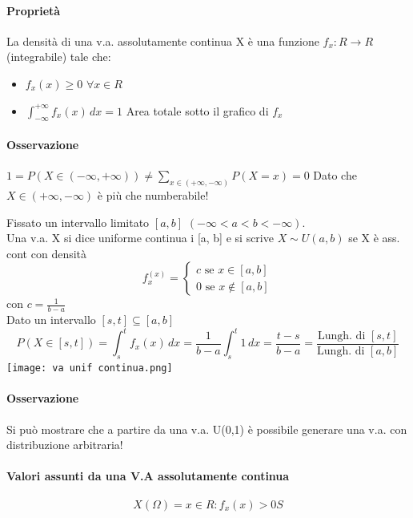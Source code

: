 \documentclass[12pt, a4paper, openany]{book}
\begin{document}
\paragraph*{Proprietà} La densità di una v.a. assolutamente continua X è una funzione 
$f_x : R \to R$ (integrabile) tale che: \begin{itemize}
    \item $f_x (x) \geq 0$ $\forall x \in R$
    \item $\int_{-\infty}^{+\infty} f_x (x) \,dx = 1$ Area 
    totale sotto il grafico di $f_x$
\end{itemize}
 \paragraph*{Osservazione} $1 = P(X \in (-\infty, +\infty)) 
 \neq \sum_{x \in (+\infty, -\infty)} P (X = x) = 0$ Dato che $X \in (+\infty, -\infty)$
 è più che numberabile!
 

Fissato un intervallo limitato $[a, b]$ $(-\infty < a < b < -\infty)$.
\\ Una v.a. X si dice uniforme continua i [a, b] e si scrive $X \sim U(a, b)$
se X è ass. cont con densità
\begin{equation*}
    f_x^(x) =
    \begin{cases}
        c \text{ se } x \in [a, b]\\
        0 \text{ se } x \notin [a, b]
    \end{cases} 
\end{equation*}
con $c = \frac{1}{b-a}$
\\ Dato un intervallo $[s, t] \subseteq [a, b]$
\begin{equation*}
    P(X \in [s,t]) = \int_s^t f_x (x) \,dx = 
    \frac{1}{b -a} \int_s^t 1 \,dx = \frac{t-s}{b-a} =
    \frac{\text{Lungh. di } [s,t]}{\text{Lungh. di } [a, b]}
\end{equation*} 
\texttt{[image: va unif continua.png]}
\paragraph*{Osservazione} Si può mostrare che a partire da una v.a. U(0,1) è possibile
generare una v.a. con distribuzione arbitraria!

\paragraph*{Valori assunti da una V.A assolutamente continua}
\begin{equation*}
    X(\Omega) = {x \in R: f_x(x) > 0S}
\end{equation*}
\end{document}
